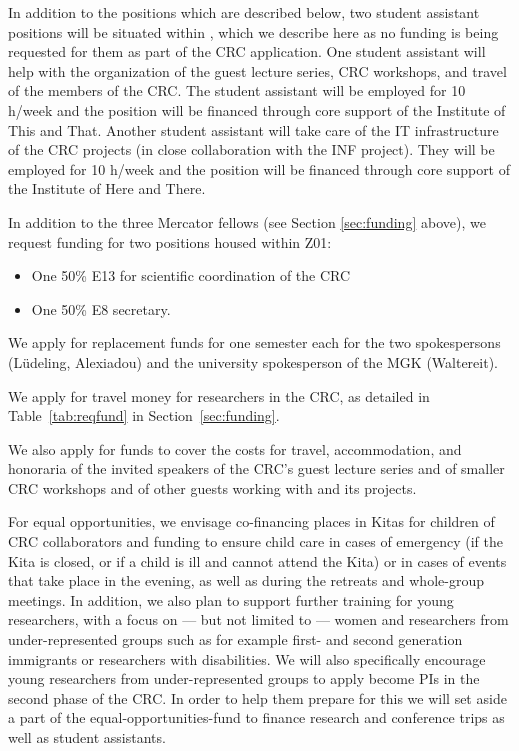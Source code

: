 In addition to the positions which are described below, two student
assistant positions will be situated within , which we
describe here as no funding is being requested for them as part of the
CRC application.  One student assistant will help with the
organization of the guest lecture series, CRC workshops, and travel of
the members of the CRC.  The student assistant will be employed for 10
h/week and the position will be financed through core support of the
Institute of This and That. Another student assistant will take care
of the IT infrastructure of the CRC projects (in close collaboration
with the INF project). They will be employed for 10 h/week and the
position will be financed through core support of the Institute of
Here and There.

\notocsubsection{\funds}

\label{Z01staff}

In addition to the three Mercator fellows (see Section
\ref{sec:funding} above), we request funding for two positions housed
within Z01:
\begin{itemize}
\item One 50\% E13 for scientific coordination of the CRC
  
\item One 50\% E8 secretary.
\end{itemize}

We apply for replacement funds for one semester each for the two
spokespersons (Lüdeling, Alexiadou) and the university spokesperson of
the MGK (Waltereit).


We apply for travel money for researchers in the CRC, as detailed in
Table~\ref{tab:reqfund} in Section~\ref{sec:funding}.
 
We also apply for funds to cover the costs for travel, accommodation,
and honoraria of the invited speakers of the CRC’s guest lecture
series and of smaller CRC workshops and of other guests working with
\thiscrc{} and its projects.


For equal opportunities, we envisage co-financing places in Kitas for
children of CRC collaborators and funding to ensure child care in
cases of emergency (if the Kita is closed, or if a child is ill and
cannot attend the Kita) or in cases of events that take place in the
evening, as well as during the retreats and whole-group meetings. In
addition, we also plan to support further training for young
researchers, with a focus on --- but not limited to --- women and
researchers from under-represented groups such as for example first-
and second generation immigrants or researchers with disabilities.  We
will also specifically encourage young researchers from
under-represented groups to apply become PIs in the second phase of
the CRC. In order to help them prepare for this we will set aside a
part of the equal-opportunities-fund to finance research and
conference trips as well as student assistants. 
